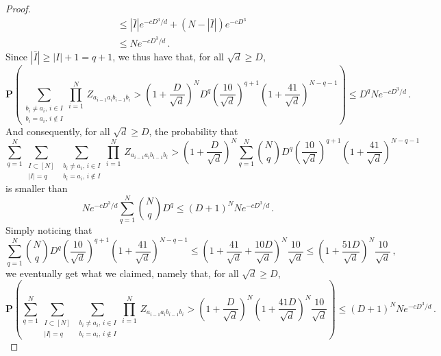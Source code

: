 \documentclass{amsart}
\renewcommand{\P}{\mathbf{P}}
\renewcommand{\leq}{\leqslant}
\renewcommand{\geq}{\geqslant}
\begin{document}
\begin{proof}
\begin{align*}
                                                                                                                                                                                                                           & \leq |\bar{I}|e^{-cD^3/d} + (N-|\bar{I}|)e^{-cD^3}                                                                                         \\
                                                                                                                                                                                                                           & \leq Ne^{-cD^3/d} \, .
    \end{align*}
    Since $|\bar{I}|\geq |I|+1=q+1$, we thus have that, for all $\sqrt{d}\geq D$,
    \[ \P\left( \sum_{\substack{b_i\neq a_i,\,i\in I \\ b_i=a_i,\,i\notin I}} \underset{i=1}{\overset{N}{\prod}}\, Z_{a_{i-1}a_ib_{i-1}b_i} > \left(1+\frac{D}{\sqrt{d}}\right)^N D^q\left(\frac{10}{\sqrt{d}}\right)^{q+1} \left(1+\frac{41}{\sqrt{d}}\right)^{N-q-1} \right) \leq D^qNe^{-cD^3/d} \, . \]
    And consequently, for all $\sqrt{d}\geq D$, the probability that
    \[ \sum_{q=1}^N \sum_{\substack{I\subset[N] \\ |I|=q}} \sum_{\substack{b_i\neq a_i,\,i\in I \\ b_i=a_i,\,i\notin I}} \underset{i=1}{\overset{N}{\prod}}\, Z_{a_{i-1}a_ib_{i-1}b_i} > \left(1+\frac{D}{\sqrt{d}}\right)^N \sum_{q=1}^N {N \choose q} D^q \left(\frac{10}{\sqrt{d}}\right)^{q+1} \left(1+\frac{41}{\sqrt{d}}\right)^{N-q-1} \]
    is smaller than
    \[ Ne^{-cD^3/d} \sum_{q=1}^N {N \choose q} D^q \leq (D+1)^{N} Ne^{-cD^3/d} \, . \]
    Simply noticing that
    \[ \sum_{q=1}^N {N \choose q} D^q \left(\frac{10}{\sqrt{d}}\right)^{q+1} \left(1+\frac{41}{\sqrt{d}}\right)^{N-q-1} \leq \left(1+\frac{41}{\sqrt{d}}+\frac{10D}{\sqrt{d}}\right)^N\frac{10}{\sqrt{d}} \leq \left(1+\frac{51D}{\sqrt{d}}\right)^N\frac{10}{\sqrt{d}} \, , \]
    we eventually get what we claimed, namely that, for all $\sqrt{d}\geq D$,
    \[ \P \left( \sum_{q=1}^N \sum_{\substack{I\subset[N] \\ |I|=q}} \sum_{\substack{b_i\neq a_i,\,i\in I \\ b_i=a_i,\,i\notin I}} \underset{i=1}{\overset{N}{\prod}}\, Z_{a_{i-1}a_ib_{i-1}b_i} > \left(1+\frac{D}{\sqrt{d}}\right)^N \left(1+\frac{41D}{\sqrt{d}}\right)^N\frac{10}{\sqrt{d}} \right) \leq (D+1)^{N} Ne^{-cD^3/d} \, . \]


\end{proof}
\end{document}
